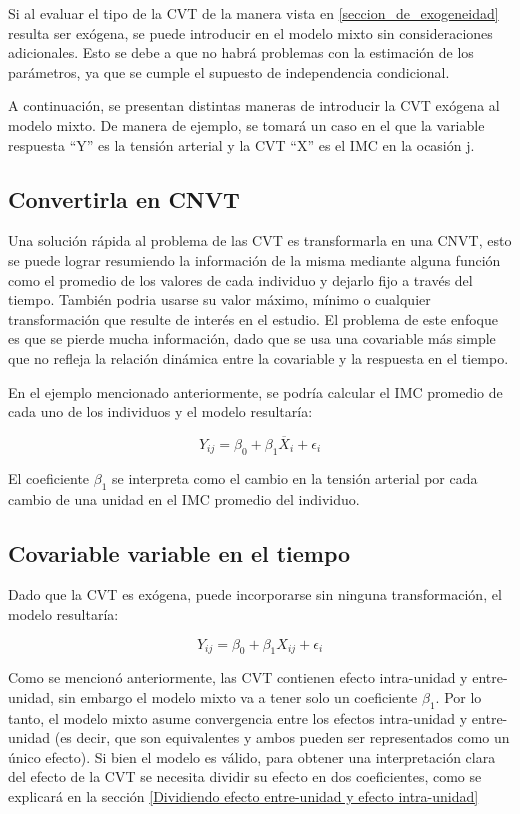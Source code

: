 \documentclass[spanish]{article}
\numberwithin{figure}{subsection}
\numberwithin{equation}{subsection}
\numberwithin{table}{subsection}
\begin{document}
Si al evaluar el tipo de la CVT de la manera vista en
\ref{seccion_de_exogeneidad} resulta ser exógena, se puede introducir en el
modelo mixto sin consideraciones adicionales. Esto se debe a que no habrá
problemas con la estimación de los parámetros, ya que se cumple el supuesto de
independencia condicional.

A continuación, se presentan distintas maneras de introducir la CVT exógena al
modelo mixto. De manera de ejemplo, se tomará un caso en el que la variable
respuesta ``Y'' es la tensión arterial y la CVT ``X'' es el IMC en la ocasión j.

\subsection{Convertirla en CNVT}

Una solución rápida al problema de las CVT es transformarla en una CNVT, esto
se puede lograr resumiendo la información de la misma mediante alguna función
como el promedio de los valores de cada individuo y dejarlo fijo a través del
tiempo. También podria usarse su valor máximo, mínimo o cualquier
transformación que resulte de interés en el estudio. El problema de este
enfoque es que se pierde mucha información, dado que se usa una covariable más
simple que no refleja la relación dinámica entre la covariable y la respuesta
en el tiempo.

En el ejemplo mencionado anteriormente, se podría calcular el IMC promedio de
cada uno de los individuos y el modelo resultaría:

\[ Y_{ij} = \beta_0 + \beta_1 \overline{X}_i + \epsilon_{i} \]

El coeficiente $\beta_1$ se interpreta como el cambio en la tensión arterial por
cada cambio de una unidad en el IMC promedio del individuo.

\subsection{Covariable variable en el tiempo}

Dado que la CVT es exógena, puede incorporarse sin ninguna transformación, el
modelo resultaría:

\[ Y_{ij} = \beta_0 + \beta_1 X_{ij} + \epsilon_{i} \]

Como se mencionó anteriormente, las CVT contienen efecto intra-unidad y
entre-unidad, sin embargo el modelo mixto va a tener solo un coeficiente
$\beta_1$. Por lo tanto, el modelo mixto asume convergencia entre los efectos
intra-unidad y entre-unidad (es decir, que son equivalentes y ambos pueden ser
representados como un único efecto). Si bien el modelo es válido, para obtener
una interpretación clara del efecto de la CVT se necesita dividir su efecto en
dos coeficientes, como se explicará en la sección \ref{Dividiendo efecto
entre-unidad y efecto intra-unidad}
\end{document}
